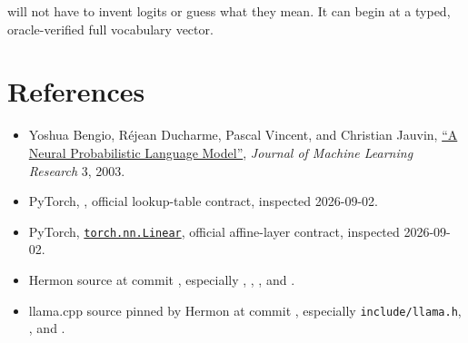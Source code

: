  will not have to invent logits or guess what they mean. It can
begin at a typed, oracle-verified full vocabulary vector.

\section{References}\label{references}

\begin{itemize}
\tightlist
\item
  Yoshua Bengio, Réjean Ducharme, Pascal Vincent, and Christian Jauvin,
  \href{https://jmlr.org/papers/v3/bengio03a.html}{``A Neural
  Probabilistic Language Model''}, \emph{Journal of Machine Learning
  Research} 3, 2003.
\item
PyTorch,
  \href{https://docs.pytorch.org/docs/stable/generated/torch.nn.Embedding}{\texttt{}},
  official lookup-table contract, inspected 2026-09-02.
\item
PyTorch,
  \href{https://docs.pytorch.org/docs/stable/generated/torch.nn.Linear.html}{\texttt{torch.nn.Linear}},
  official affine-layer contract, inspected 2026-09-02.
\item
  Hermon source at commit
  \texttt{},
  especially \texttt{},
  \texttt{},
  \texttt{}, and
  \texttt{}.
\item
  llama.cpp source pinned by Hermon at commit
  \texttt{},
  especially \texttt{include/llama.h},
  \texttt{}, and
  \texttt{}.
\end{itemize}



